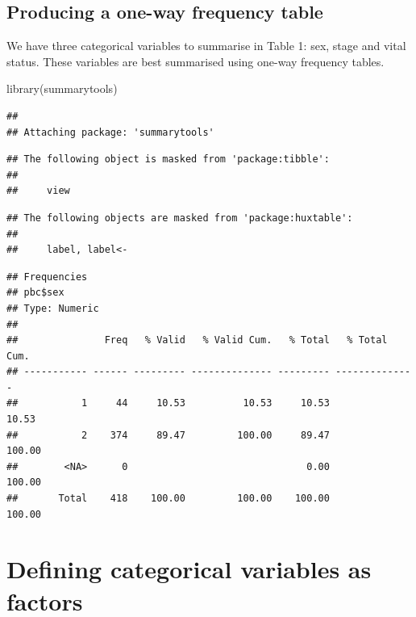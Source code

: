 \documentclass[
]{memoir}
\newenvironment{Shaded}{\begin{snugshade}}{\end{snugshade}}
\newcommand{\FunctionTok}[1]{\textcolor[rgb]{0.00,0.00,0.00}{#1}}
\newcommand{\NormalTok}[1]{#1}
\newcommand{\SpecialCharTok}[1]{\textcolor[rgb]{0.00,0.00,0.00}{#1}}
\begin{document}
\hypertarget{producing-a-one-way-frequency-table}{%
\subsection{Producing a one-way frequency table}\label{producing-a-one-way-frequency-table}}

We have three categorical variables to summarise in Table 1: sex, stage and vital status. These variables are best summarised using one-way frequency tables.

\begin{Shaded}
\begin{Highlighting}[]
\FunctionTok{library}\NormalTok{(summarytools)}
\end{Highlighting}
\end{Shaded}

\begin{verbatim}
## 
## Attaching package: 'summarytools'
\end{verbatim}

\begin{verbatim}
## The following object is masked from 'package:tibble':
## 
##     view
\end{verbatim}

\begin{verbatim}
## The following objects are masked from 'package:huxtable':
## 
##     label, label<-
\end{verbatim}

\begin{Shaded}
\end{Shaded}

\begin{verbatim}
## Frequencies  
## pbc$sex  
## Type: Numeric  
## 
##               Freq   % Valid   % Valid Cum.   % Total   % Total Cum.
## ----------- ------ --------- -------------- --------- --------------
##           1     44     10.53          10.53     10.53          10.53
##           2    374     89.47         100.00     89.47         100.00
##        <NA>      0                               0.00         100.00
##       Total    418    100.00         100.00    100.00         100.00
\end{verbatim}

\hypertarget{defining-categorical-variables-as-factors}{%
\section{Defining categorical variables as factors}\label{defining-categorical-variables-as-factors}}
\end{document}
